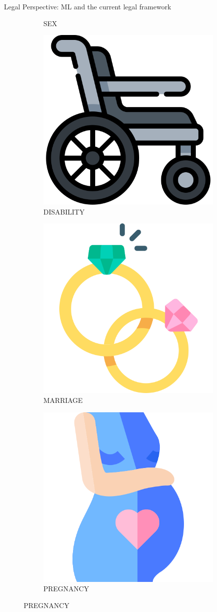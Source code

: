 \begin{frame}{Legal Perspective: ML and the current legal framework \cite{Singh, automatedDsicrimination}}
\begin{figure}
\begin{subfigure}{.165\textwidth}
            \caption{SEX}
            \label{fig:sub2}
        \end{subfigure}%
        \begin{subfigure}{.165\textwidth}
            \centering
            \includegraphics[width=.4\linewidth]{presentation/assets/disability.png}
            \caption{DISABILITY}
            \label{fig:sub3}
        \end{subfigure}%
        \begin{subfigure}{.165\textwidth}
            \centering
            \includegraphics[width=.4\linewidth]{presentation/assets/marriage.png}
            \caption{MARRIAGE}
            \label{fig:sub4}
        \end{subfigure}%
        \begin{subfigure}{.165\textwidth}
            \centering
            \includegraphics[width=.4\linewidth]{presentation/assets/pregnancy.png}
            \caption{PREGNANCY}
            \label{fig:sub5}

\end{subfigure}
\end{figure}
\end{frame}
